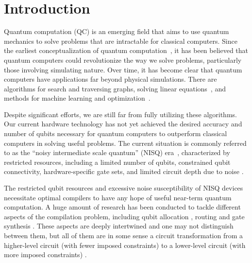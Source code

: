 \chapter{Introduction}

Quantum computation (QC) is an emerging field that aims to use quantum mechanics to solve problems that are intractable for classical computers. Since the earliest conceptualization of quantum computation~\cite{feynman1986}, it has been believed that quantum computers could revolutionize the way we solve problems, particularly those involving simulating nature. Over time, it has become clear that quantum computers have applications far beyond physical simulations. There are algorithms for search and traversing graphs, solving linear equations~\cite{montanaro2016}, and methods for machine learning and optimization~\cite{jordan2023}.

Despite significant efforts, we are still far from fully utilizing these algorithms. Our current hardware technology has not yet achieved the desired accuracy and number of qubits necessary for quantum computers to outperform classical computers in solving useful problems. The current situation is commonly referred to as the ``noisy intermediate scale quantum'' (NISQ) era~\cite{preskill2018}, characterized by restricted resources, including a limited number of qubits, constrained qubit connectivity, hardware-specific gate sets, and limited circuit depth due to noise \cite{cross2019}.

The restricted qubit resources and excessive noise susceptibility of NISQ devices necessitate optimal compilers to have any hope of useful near-term quantum computation. A huge amount of research has been conducted to tackle different aspects of the compilation problem, including qubit allocation \cite{itoko2019,siraichi2018,paler2019,zhang2021,li2019}, routing \cite{childs,zhou2020,itoko2019,cowtan2019,nash2020,kissinger2019} and gate synthesis \cite{shende2006,vatan2004,vatan2004a,shende2004,barenco1995,dawson2006}. These aspects are deeply intertwined and one may not distinguish between them, but all of them are in some sense a circuit transformation from a higher-level circuit (with fewer imposed constraints) to a lower-level circuit (with more imposed constraints) \cite{hundt2022}.

